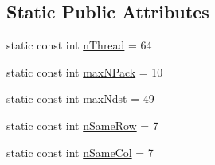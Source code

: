 \subsection*{Static Public Attributes}
\begin{DoxyCompactItemize}
\item 
static const int \mbox{\hyperlink{classRlmpiInitializer_ad9590f174fd471edc89169b1bdf363cb}{n\+Thread}} = 64
\item 
static const int \mbox{\hyperlink{classRlmpiInitializer_a1fa14c22d1b48a1cb1a3d15442039004}{max\+N\+Pack}} = 10
\item 
static const int \mbox{\hyperlink{classRlmpiInitializer_aa4d2d2f2a7ae035c643764931e3051dd}{max\+Ndst}} = 49
\item 
static const int \mbox{\hyperlink{classRlmpiInitializer_a2d22ddb2234a52f0c5d31453ec580385}{n\+Same\+Row}} = 7
\item 
static const int \mbox{\hyperlink{classRlmpiInitializer_a64e7c621072e0d7aefd6d0b3707f816b}{n\+Same\+Col}} = 7
\end{DoxyCompactItemize}
